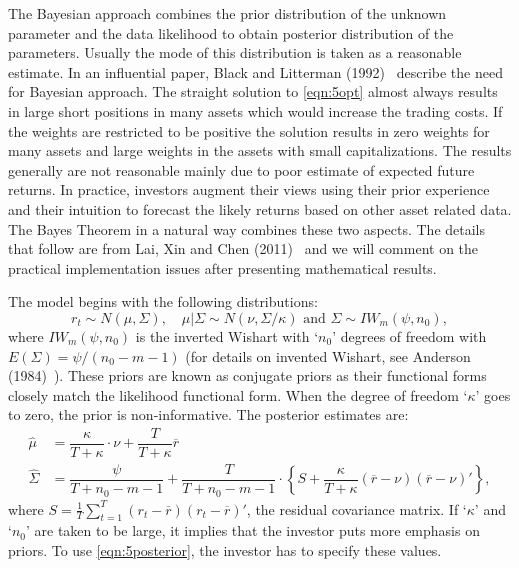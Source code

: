 The Bayesian approach combines the prior distribution of the unknown parameter and the data likelihood to obtain posterior distribution of the parameters. Usually the mode of this distribution is taken as a reasonable estimate. In an influential paper, Black and Litterman (1992)~\cite{blacklit} describe the need for Bayesian approach. The straight solution to \eqref{eqn:5opt} almost always results in large short positions in many assets which would increase the trading costs. If the weights are restricted to be positive the solution results in zero weights for many assets and large weights in the assets with small capitalizations. The results generally are not reasonable mainly due to poor estimate of expected future returns. In practice, investors augment their views using their prior experience and their intuition to forecast the likely returns based on other asset related data. The Bayes Theorem in a natural way combines these two aspects. The details that follow are from Lai, Xin and Chen (2011)~\cite{laixingchen} and we will comment on the practical implementation issues after presenting mathematical results. 


The model begins with the following distributions:
	\begin{equation} \label{eqn:5distributions}
	r_t \sim N(\mu,\Sigma), \quad \mu \big| \Sigma \sim N(\nu, \Sigma/\kappa) \text{ and } \Sigma \sim I W_m(\psi,n_0),
	\end{equation}
where $I W_m(\psi,n_0)$ is the inverted Wishart with `$n_0$' degrees of freedom with $E(\Sigma)= \psi/(n_0 - m - 1)$ (for details on invented Wishart, see Anderson (1984)~\cite{andersontw2}). These priors are known as conjugate priors as their functional forms closely match the likelihood functional form. When the degree of freedom `$\kappa$' goes to zero, the prior is non-informative. The posterior estimates are:
	\begin{equation}\label{eqn:5posterior}
	\begin{split}
	\hat{\mu}&= \dfrac{\kappa}{T+\kappa} \cdot \nu + \dfrac{T}{T+\kappa} \overline{r} \\
	\hat{\Sigma}&= \dfrac{\psi}{T+n_0-m-1} + \dfrac{T}{T+n_0-m-1} \cdot \left\{S + \dfrac{\kappa}{T+\kappa} (\overline{r}-\nu)(\overline{r}-\nu)' \right\},
	\end{split}
	\end{equation}
where $S= \frac{1}{T} \sum_{t=1}^T (r_t - \overline{r})(r_t - \overline{r})'$, the residual covariance matrix. If `$\kappa$' and `$n_0$' are taken to be large, it implies that the investor puts more emphasis on priors. To use \eqref{eqn:5posterior}, the investor has to specify these values. 


